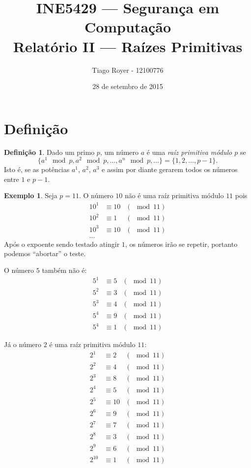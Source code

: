 \documentclass{article}
\title{
    INE5429 --- Segurança em Computação \\
    Relatório II --- Raízes Primitivas
}
\author{
    Tiago Royer - 12100776
}
\date{28 de setembro de 2015}
\theoremstyle{definition}
\newtheorem{definition}{Definição}
\newtheorem{example}{Exemplo}
\begin{document}
\maketitle

\section{Definição}

\begin{definition}
    Dado um primo $p$,
    um número $a$ é uma \emph{raíz primitiva módulo $p$}
    se
    \begin{equation*}
        \{a^1 \mod p, a^2 \mod p, \dots, a^n \mod p, \dots \} = \{1, 2, \dots, p-1\}.
    \end{equation*}
    Isto é, se as potências $a^1$, $a^2$, $a^3$ e assim por diante
    gerarem todos os números entre $1$ e $p-1$.
\end{definition}

\begin{example}
    Seja $p = 11$.
    O número $10$ não é uma raíz primitiva módulo $11$ pois
    \begin{align*}
        10^1 &\equiv 10 & (\mod 11) \\
        10^2 &\equiv 1 & (\mod 11) \\
        10^3 &\equiv 10 & (\mod 11) \\
        ...
    \end{align*}
    Após o expoente sendo testado atingir $1$,
    os números irão se repetir,
    portanto podemos ``abortar'' o teste.

    O número $5$ também não é:
    \begin{align*}
        5^1 &\equiv 5 & (\mod 11) \\
        5^2 &\equiv 3 & (\mod 11) \\
        5^3 &\equiv 4 & (\mod 11) \\
        5^4 &\equiv 9 & (\mod 11) \\
        5^4 &\equiv 1 & (\mod 11)
    \end{align*}

    Já o número $2$ é uma raíz primitiva módulo $11$:
    \begin{align*}
        2^1 &\equiv 2 & (\mod 11) \\
        2^2 &\equiv 4 & (\mod 11) \\
        2^3 &\equiv 8 & (\mod 11) \\
        2^4 &\equiv 5 & (\mod 11) \\
        2^5 &\equiv 10 & (\mod 11) \\
        2^6 &\equiv 9 & (\mod 11) \\
        2^7 &\equiv 7 & (\mod 11) \\
        2^8 &\equiv 3 & (\mod 11) \\
        2^9 &\equiv 6 & (\mod 11) \\
        2^{10} &\equiv 1 & (\mod 11)
    \end{align*}
\end{example}
\end{document}
